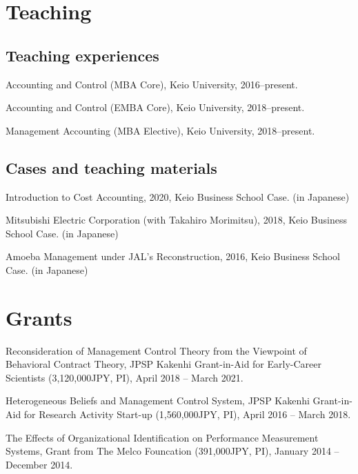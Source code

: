 \documentclass[letterpaper,uplatex]{article}
\renewenvironment{itemize}{
  \begin{list}{}{
    \setlength{\leftmargin}{1.5em}
  }
}{
  \end{list}
}
\begin{document}
\section*{Teaching}

\subsection*{Teaching experiences}

\begin{itemize}
	\item Accounting and Control (MBA Core), Keio University, 2016--present.
	\item Accounting and Control (EMBA Core), Keio University, 2018--present.
	\item Management Accounting (MBA Elective), Keio University, 2018--present.
\end{itemize}

\subsection*{Cases and teaching materials}

\begin{itemize}
   \item Introduction to Cost Accounting, 2020, Keio Business School Case. (in Japanese)
   \item Mitsubishi Electric Corporation (with Takahiro Morimitsu), 2018, Keio Business School Case. (in Japanese)
   \item Amoeba Management under JAL's Reconstruction, 2016, Keio Business School Case. (in Japanese)
\end{itemize}

\section*{Grants}

\begin{itemize}
\item Reconsideration of Management Control Theory from the Viewpoint of Behavioral Contract Theory, JPSP Kakenhi Grant-in-Aid for Early-Career Scientists (3,120,000JPY, PI), April 2018 -- March 2021.

\item Heterogeneous Beliefs and Management Control System, JPSP Kakenhi Grant-in-Aid for Research Activity Start-up (1,560,000JPY, PI), April 2016 -- March 2018.

\item The Effects of Organizational Identification on Performance Measurement Systems, Grant from The Melco Founcation (391,000JPY, PI), January 2014 -- December 2014.
\end{itemize}
\end{document}

